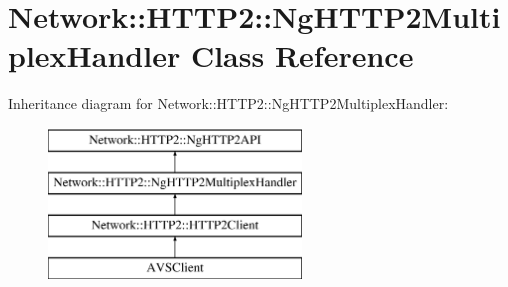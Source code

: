 \hypertarget{classNetwork_1_1HTTP2_1_1NgHTTP2MultiplexHandler}{}\section{Network\+:\+:H\+T\+T\+P2\+:\+:Ng\+H\+T\+T\+P2\+Multiplex\+Handler Class Reference}
\label{classNetwork_1_1HTTP2_1_1NgHTTP2MultiplexHandler}
Inheritance diagram for Network\+:\+:H\+T\+T\+P2\+:\+:Ng\+H\+T\+T\+P2\+Multiplex\+Handler\+:\begin{figure}[H]
\begin{center}
\leavevmode
\includegraphics[height=4.000000cm]{d0/dab/classNetwork_1_1HTTP2_1_1NgHTTP2MultiplexHandler}
\end{center}
\end{figure}
